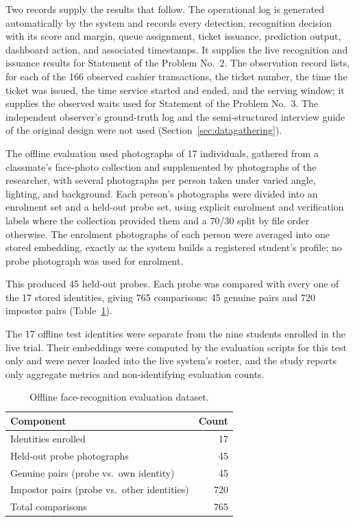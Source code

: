 \documentclass{research}
\begin{document}
Two records supply the results that follow.\label{cr:oplog} The
operational log is generated automatically by the system and records every detection,
recognition decision with its score and margin, queue assignment,
ticket issuance, prediction output, dashboard action, and associated
timestamps. It supplies the live recognition and issuance results for
Statement of the Problem No.~2. The observation record lists, for each
of the 166 observed cashier transactions, the ticket number, the time
the ticket was issued, the time service started and ended, and the
serving window; it supplies the observed waits used for Statement of
the Problem No.~3. The independent observer's ground-truth log and the
semi-structured interview guide of the original design were not used
(Section~\ref{sec:datagathering}).

\label{subsec:eval-dataset}

The offline evaluation used photographs of 17 individuals, gathered
from a classmate's face-photo collection and supplemented by
photographs of the researcher, with several photographs per person taken
under varied angle, lighting, and background. Each person's photographs
were divided into an enrolment set and a held-out probe set, using
explicit enrolment and verification labels where the collection
provided them and a 70/30 split by file order otherwise. The enrolment
photographs of each person were averaged into one stored embedding,
exactly as the system builds a registered student's profile; no probe
photograph was used for enrolment.

This produced 45 held-out probes. Each probe was compared with every one
of the 17 stored identities, giving 765 comparisons: 45 genuine pairs
and 720 impostor pairs (Table~\ref{tab:eval-dataset}).

The 17 offline test identities were separate from the nine students
enrolled in the live trial. Their embeddings were computed by the
evaluation scripts for this test only and were never loaded into the
live system's roster, and the study reports only aggregate metrics and
non-identifying evaluation counts.

\begin{table}[!htbp]
\centering
\caption{Offline face-recognition evaluation dataset.}
\label{tab:eval-dataset}
\begin{tabular}{lr}
\hline
Component & Count \\
\hline
Identities enrolled & 17 \\
Held-out probe photographs & 45 \\
Genuine pairs (probe vs.\ own identity) & 45 \\
Impostor pairs (probe vs.\ other identities) & 720 \\
\hline
Total comparisons & 765 \\
\hline
\end{tabular}
\end{table}
\end{document}
